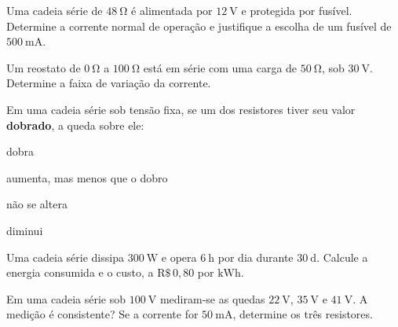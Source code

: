 \begin{questao}[2]{}

Uma cadeia série de $\SI{48}{\ohm}$ é alimentada por $\SI{12}{\volt}$ e
protegida por fusível. Determine a corrente normal de operação e justifique a
escolha de um fusível de $\SI{500}{\milli\ampere}$.


\end{questao}
\begin{questao}[2]{}

Um reostato de $\SI{0}{\ohm}$ a $\SI{100}{\ohm}$ está em série com uma carga de
$\SI{50}{\ohm}$, sob $\SI{30}{\volt}$. Determine a faixa de variação da
corrente.


\end{questao}
\begin{questao}[2]{}

Em uma cadeia série sob tensão fixa, se um dos resistores tiver seu valor
\textbf{dobrado}, a queda sobre ele:
\begin{alternativas}[2]
\item dobra
\item aumenta, mas menos que o dobro
\item não se altera
\item diminui
\end{alternativas}


\end{questao}
\begin{questao}[2]{}

Uma cadeia série dissipa $\SI{300}{\watt}$ e opera $\SI{6}{\hour}$ por dia
durante $\SI{30}{\day}$. Calcule a energia consumida e o custo, a
$\mathrm{R\$}\,0{,}80$ por $\si{\kilo\watt\hour}$.


\end{questao}
\begin{questao}[2]{}

Em uma cadeia série sob $\SI{100}{\volt}$ mediram-se as quedas
$\SI{22}{\volt}$, $\SI{35}{\volt}$ e $\SI{41}{\volt}$. A medição é consistente?
Se a corrente for $\SI{50}{\milli\ampere}$, determine os três resistores.


\end{questao}

